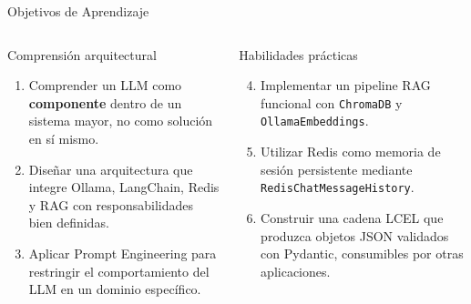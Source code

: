 \documentclass[aspectratio=169]{beamer}
\begin{document}
\begin{frame}{Objetivos de Aprendizaje}
  \begin{columns}
    \begin{block}{Comprensión arquitectural}
      \begin{enumerate}
        \item Comprender un LLM como \textbf{componente} dentro de un sistema mayor, no como solución en sí mismo.
        \item Diseñar una arquitectura que integre Ollama, LangChain, Redis y RAG con responsabilidades bien definidas.
        \item Aplicar Prompt Engineering para restringir el comportamiento del LLM en un dominio específico.
      \end{enumerate}
    \end{block}
    \begin{exampleblock}{Habilidades prácticas}
      \begin{enumerate}
        \setcounter{enumi}{3}
        \item Implementar un pipeline RAG funcional con \texttt{ChromaDB} y \texttt{OllamaEmbeddings}.
        \item Utilizar Redis como memoria de sesión persistente mediante \texttt{RedisChatMessageHistory}.
        \item Construir una cadena LCEL que produzca objetos JSON validados con Pydantic, consumibles por otras aplicaciones.
      \end{enumerate}
    \end{exampleblock}
  \end{columns}
\end{frame}
\end{document}
